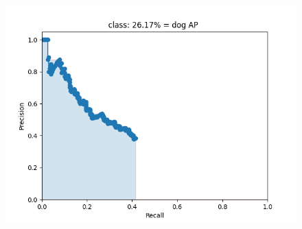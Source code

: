 \documentclass{article}%
\begin{document}
\begin{figure}[H]
\begin{minipage}{0.24\linewidth}
	\end{minipage}
    \begin{minipage}{0.24\linewidth}
		\centering
		\includegraphics[width=0.9\linewidth]{fast_rcnn/mAP_output/classes/dog.png}
	\end{minipage}
\end{figure}
\end{document}

